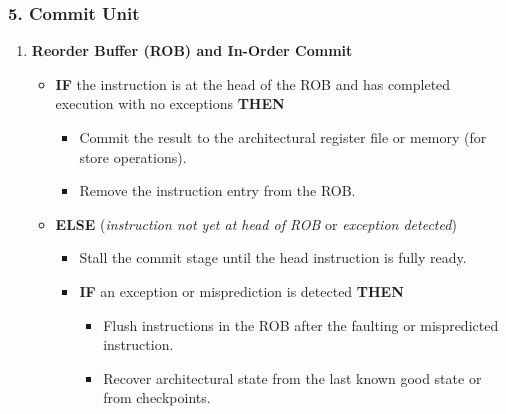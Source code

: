{  \subsubsection*{5. Commit Unit}
  \vspace{-5px}
  \begin{enumerate}
      \item \textbf{Reorder Buffer (ROB) and In-Order Commit}
      \begin{itemize}
          \item \textbf{IF} the instruction is at the head of the ROB and has completed execution with no exceptions \textbf{THEN}
          \begin{itemize}
              \item Commit the result to the architectural register file or memory (for store operations).
              \item Remove the instruction entry from the ROB.
          \end{itemize}
          \item \textbf{ELSE} (\emph{instruction not yet at head of ROB} or \emph{exception detected})
          \begin{itemize}
              \item Stall the commit stage until the head instruction is fully ready.
              \item \textbf{IF} an exception or misprediction is detected \textbf{THEN}
              \begin{itemize}
                  \item Flush instructions in the ROB after the faulting or mispredicted instruction.
                  \item Recover architectural state from the last known good state or from checkpoints.
              \end{itemize}
          \end{itemize}
      \end{itemize}
  \end{enumerate}
  \vspace{-15px}
}

